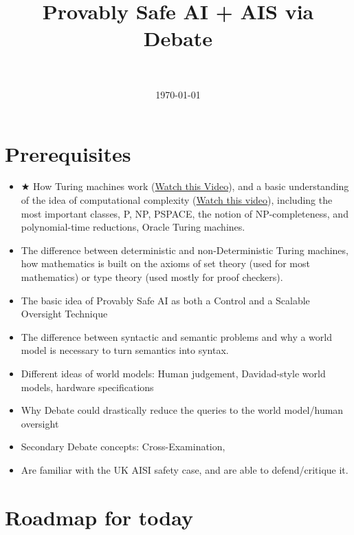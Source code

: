 \documentclass[11pt]{article}
\title{Provably Safe AI + AIS via Debate}
\author{\authorname{Stephan Wäldchen}\\ \affiliation{Iliad}}
\date{\today}
\begin{document}
\maketitle

\section{Prerequisites}
\label{sec:prereqs}

\begin{itemize}
  \item $\bigstar$ How Turing machines work (\href{https://www.youtube.com/watch?v=gJQTFhkhwPA}{Watch this Video}), and a basic understanding of the idea of computational complexity (\href{https://www.youtube.com/watch?v=YX40hbAHx3s}{Watch this video}), including the most important classes, P, NP, PSPACE, the notion of NP-completeness, and polynomial-time reductions, Oracle Turing machines.
  \item The difference between deterministic and non-Deterministic Turing machines, how mathematics is built on the axioms of set theory (used for most mathematics) or type theory (used mostly for proof checkers).
\end{itemize}

\begin{learningoutcomes}
  \begin{itemize}
    \item The basic idea of Provably Safe AI as both a Control and a Scalable Oversight Technique
    \item The difference between syntactic and semantic problems and why a world model is necessary to turn semantics into syntax.
    \item Different ideas of world models: Human judgement, Davidad-style world models, hardware specifications
    \item Why Debate could drastically reduce the queries to the world model/human oversight
    \item Secondary Debate concepts: Cross-Examination,
    \item Are familiar with the UK AISI safety case, and are able to defend/critique it.
  \end{itemize}
\end{learningoutcomes}

\section{Roadmap for today}
\label{sec:roadmap}
\end{document}
